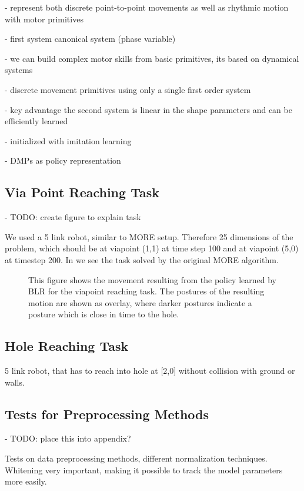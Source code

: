 - represent both discrete point-to-point movements as well as rhythmic motion
with motor primitives

- first system canonical system (phase variable)

- we can build complex motor skills from basic primitives,
  its based on dynamical systems

- discrete movement primitives using only a single first order system

- key advantage the second system is linear in the shape parameters and can
  be efficiently learned

- initialized with imitation learning

- DMPs as policy representation

\subsection{Via Point Reaching Task}
- TODO: create figure to explain task

We used a 5 link robot, similar to MORE setup.
Therefore 25 dimensions of the problem, which should be at viapoint (1,1)
at time step 100 and at viapoint (5,0) at timestep 200.
In  we see the task solved by the original MORE algorithm.

\begin{figure}[ht!]
  \centering
     
     \hspace{1cm}                       
     \caption{This figure shows the movement resulting from the policy
       learned by BLR for the viapoint reaching task.
       The postures of the resulting motion are shown as overlay,
       where darker postures indicate a posture which
       is close in time to the hole.}
     \label{fig:blr_via}  
\end{figure}

\subsection{Hole Reaching Task}
5 link robot, that has to reach into hole at [2,0] without collision
with ground or walls.

\subsection{Tests for Preprocessing Methods}
- TODO: place this into appendix?

Tests on data preprocessing methods, different normalization techniques.
Whitening very important, making it possible to track the model parameters
more easily.

